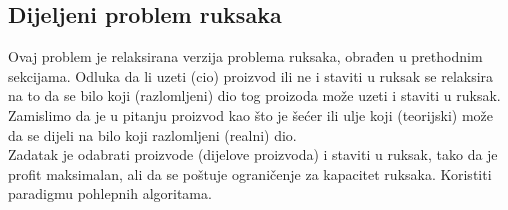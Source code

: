 \subsection{Dijeljeni problem ruksaka}
\begin{example}
  Ovaj problem je relaksirana verzija problema ruksaka, obrađen u prethodnim sekcijama. Odluka da li uzeti (cio)  proizvod ili ne i staviti u ruksak se relaksira na to da se bilo koji (razlomljeni) dio tog proizoda može uzeti i staviti u ruksak. Zamislimo da je u pitanju proizvod kao što je šećer ili ulje koji (teorijski) može da se dijeli na bilo koji razlomljeni  (realni) dio.  \\
  
   Zadatak je odabrati proizvode (dijelove proizvoda) i staviti u ruksak, tako da je profit maksimalan, ali da se poštuje ograničenje za kapacitet  ruksaka. Koristiti paradigmu pohlepnih algoritama. 
\end{example}

